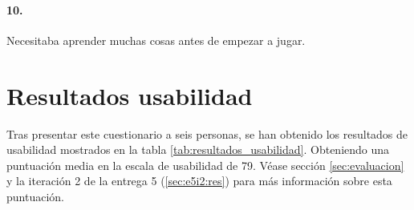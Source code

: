 \paragraph{10.} Necesitaba aprender muchas cosas antes de empezar a jugar.

\begin{table}[H]
	\centering
\end{table}



\newpage

\section{Resultados usabilidad}
\label{sec:apendice:Custionarios:Resultados}

Tras presentar este cuestionario a seis personas, se han obtenido los resultados de usabilidad mostrados en la tabla \ref{tab:resultados_usabilidad}. Obteniendo una puntuación media en la escala de usabilidad de 79. Véase sección \ref{sec:evaluacion} y la iteración 2 de la entrega 5 (\ref{sec:e5i2:res}) para más información sobre esta puntuación.


\begin{table}[H]
	\centering
	\caption{Resultados de usabilidad obtenidos tras la prueba}
	\label{tab:resultados_usabilidad}
\end{table}


\chapterend
